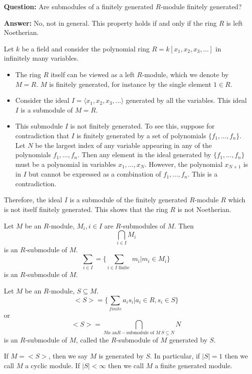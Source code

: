 \documentclass[11pt, a4paper]{report}
\begin{document}
\textbf{Question:} Are submodules of a finitely generated $R$-module finitely generated?

\textbf{Answer:} No, not in general. This property holds if and only if the ring $R$ is left Noetherian.

\begin{example}
Let $k$ be a field and consider the polynomial ring $R = k[x_1, x_2, x_3, \dots]$ in infinitely many variables.
\begin{itemize}
    \item The ring $R$ itself can be viewed as a left $R$-module, which we denote by $M=R$. $M$ is finitely generated, for instance by the single element $1 \in R$.
    \item Consider the ideal $I = \langle x_1, x_2, x_3, \dots \rangle$ generated by all the variables. This ideal $I$ is a submodule of $M=R$.
    \item This submodule $I$ is not finitely generated. To see this, suppose for contradiction that $I$ is finitely generated by a set of polynomials $\{f_1, \dots, f_n\}$. Let $N$ be the largest index of any variable appearing in any of the polynomials $f_1, \dots, f_n$. Then any element in the ideal generated by $\{f_1, \dots, f_n\}$ must be a polynomial in variables $x_1, \dots, x_N$. However, the polynomial $x_{N+1}$ is in $I$ but cannot be expressed as a combination of $f_1, \dots, f_n$. This is a contradiction.
\end{itemize}
Therefore, the ideal $I$ is a submodule of the finitely generated $R$-module $R$ which is not itself finitely generated. This shows that the ring $R$ is not Noetherian.
\end{example}

\begin{definition} 
    Let $ M $ be an $ R $-module, $ M_i, i\in I $ are $ R $-submodules of $ M $. Then 
    \[
    \bigcap_{i\in I} M_i
    \]     
is an $ R $-submodule of $ M $.   
\[
\sum_{i\in I} = \{ \sum_{i \in I \text{ finite }} m_i | m_i \in M_i\} 
\]
is an $ R $-submodule of $ M $.
\end{definition}

\begin{definition} 
Let $M$ be an $R$-module, $ S \subseteq M $. 
\[
<S> = \{ \sum_{finite} {a_is_i} | a_i \in R, s_i \in S \}
\]
or
\[
<S>=\bigcap_{N \text{is an} R -\text{submodule of }  M   \   S \subseteq N } N
\]
is an $ R $-submodule of $ M $, called the $ R $-submodule of $ M $ generated by $ S $.   

If $ M=<S> $, then we say $ M $ is generated by $ S $. In particular, if $ |S|=1 $ then we call $ M $ a cyclic module. If $ |S| < \infty $ then we call $ M $ a finite generated module.    
\end{definition}
\end{document}
